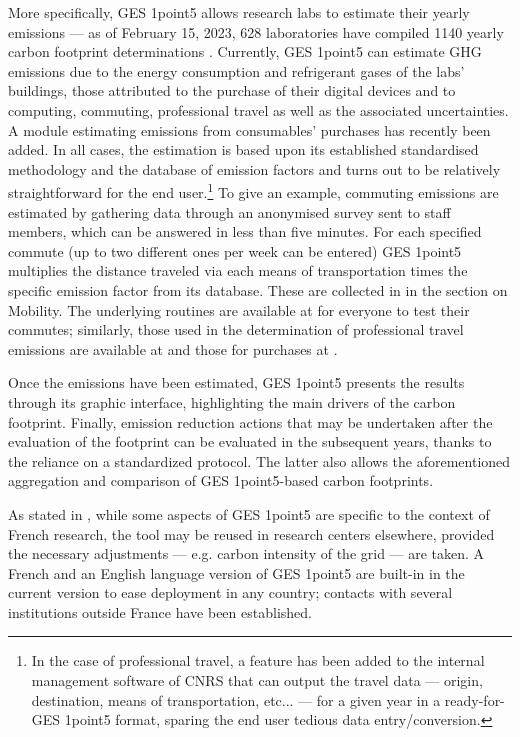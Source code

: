 \documentclass[../SustainableHEP.tex]{subfiles}
\begin{document}
\begin{bestpractice}
More specifically, GES 1point5 allows research labs to
estimate their yearly emissions --- as of February 15, 2023,
628 laboratories have compiled 1140 yearly carbon footprint 
determinations \cite{labos1p5web}.
Currently, GES 1point5 can estimate GHG emissions 
due to the energy consumption and refrigerant gases of the labs' buildings, 
those attributed to the purchase of their digital devices and to computing, 
commuting, professional travel as well as the associated uncertainties.
A module estimating emissions from consumables' purchases has recently been added.
In all cases, the estimation is based upon its established
standardised methodology and the database of emission factors and turns out 
to be relatively straightforward for the end user.\footnote{In the case
of professional travel, a feature has been added to the internal management software
of CNRS that can output the travel data --- origin, destination, means of transportation, etc... ---
for a given year in a ready-for-GES 1point5 format,
sparing the end user tedious data entry/conversion.} To give an example, 
commuting emissions are estimated by gathering data through an anonymised survey
sent to staff members, which can be answered in less than five minutes.
For each specified commute (up to two different ones per week can be entered)
GES 1point5 multiplies the distance traveled via each means of transportation times
the specific emission factor from its database. These are collected in  in the section on Mobility.
The underlying routines are available at \cite{1p5commute} for everyone to test their 
commutes; similarly, those used in the determination of professional travel emissions are 
available at \cite{1p5travel} and those for purchases at 
\cite{1p5purchases}.

Once the emissions have been estimated, GES 1point5 presents the results 
through its graphic interface, highlighting the main drivers of the carbon footprint. 
Finally, emission reduction actions that may be undertaken after the evaluation of the 
footprint can be evaluated in the subsequent years, thanks to the reliance
on a standardized protocol. The latter also allows the aforementioned 
aggregation and comparison of GES 1point5-based carbon footprints.

As stated in \cite{labos1p5}, while some aspects of GES 1point5 are specific 
to the context of French research, the tool  may be reused in research centers elsewhere, provided
the necessary adjustments --- e.g. carbon intensity of the grid --- are taken. 
A French and an English language version of GES 1point5 are built-in in the current version to ease deployment in any country; contacts with several institutions outside France 
have been established.
\end{bestpractice}
\end{document}

